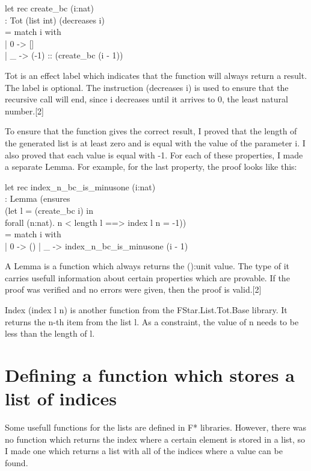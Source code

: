 { \selectfont
let rec create_bc (i:nat) \\
  : Tot (list int) (decreases i) \\
  = match i with \\
    | 0 -> [] \\
    | _ -> (-1) :: (create_bc (i - 1))
}

Tot is an effect label which indicates that the function will always return a result. The label is optional. The instruction (decreases i) is used to ensure that the recursive call will end, since i decreases until it arrives to 0, the least natural number.[2]

To ensure that the function gives the correct result, I proved that the length of the generated list is at least zero and is equal with the value of the parameter i. I also proved that each value is equal with -1. For each of these properties, I made a separate Lemma. For example, for the last property, the proof looks like this:

{ \selectfont
let rec index_n_bc_is_minusone (i:nat) \\
  : Lemma (ensures \\
          (let l = (create_bc i) in \\
           forall (n:nat). n < length l ==> index l n = -1)) \\
  = match i with \\
    | 0 -> ()
    | _ -> index_n_bc_is_minusone (i - 1)
}

A Lemma is a function which always returns the ():unit value. The type of it carries usefull information about certain properties which are provable. If the proof was verified and no errors were given, then the proof is valid.[2]

Index (index l n) is another function from the FStar.List.Tot.Base library. It returns the n-th item from the list l. As a constraint, the value of n needs to be less than the length of l.

\section{Defining a function which stores a list of indices}

Some usefull functions for the lists are defined in F* libraries. However, there was no function which returns the index where a certain element is stored in a list, so I made one which returns a list with all of the indices where a value can be found. 